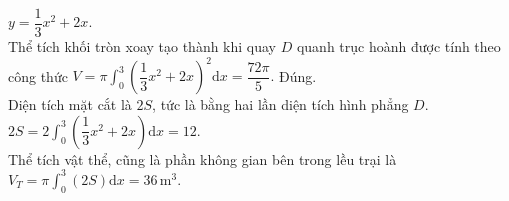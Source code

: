 \begin{ex}
{\begin{itemchoice}
			$y=\dfrac{1}{3}x^2 + 2x$.\\
			Thể tích khối tròn xoay tạo thành khi quay $D$ quanh trục hoành được tính theo công thức $V=\pi \displaystyle\int_0^3 (\dfrac{1}{3}x^2 + 2x)^2 \mathrm{d} x = \dfrac{72 \pi}{5}.$
			\itemch Đúng. \\
			Diện tích mặt cắt là $2S$, tức là bằng hai lần diện tích hình phẳng $D$.\\
			$2S=2\displaystyle\int_0^3 (\dfrac{1}{3}x^2 + 2x) \mathrm{d}x = 12$.\\
			Thể tích vật thể, cũng là phần không gian bên trong lều trại là
			$V_T=\pi \displaystyle\int_0^3 (2S) \mathrm{d} x = 36 \,\mathrm{m}^{3}$.
		\end{itemchoice}
	}
\end{ex}

